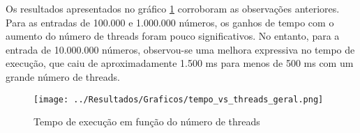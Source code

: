 Os resultados apresentados no gráfico \ref{fig: tempo_exec} corroboram as observações anteriores. Para as entradas de 100.000 e 1.000.000 números, os ganhos de tempo com o aumento do número de threads foram pouco significativos. No entanto, para a entrada de 10.000.000 números, observou-se uma melhora expressiva no tempo de execução, que caiu de aproximadamente 1.500 ms para menos de 500 ms com um grande número de threads.

\begin{figure}[htbp!]
\centering
\texttt{[image: ../Resultados/Graficos/tempo\_vs\_threads\_geral.png]}
\caption{Tempo de execução em função do número de threads}
\label{fig: tempo_exec}
\end{figure}